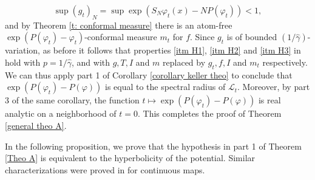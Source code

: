 \documentclass[12pt]{amsart}
\numberwithin{equation}{section} %
\numberwithin{figure}{section} %
\theoremstyle{plain}
\theoremstyle{definition}
\theoremstyle{remark}
\theoremstyle{citing}
\renewcommand{\=}{\coloneqq}
\begin{document}
\begin{equation*}\sup (g_t)_N = \sup \exp(S_N \varphi_t(x) - NP(\varphi_t))<1,
\end{equation*}
and by Theorem \ref{t: conformal measure} there is an atom-free $\exp(P(\varphi_t)-\varphi_t)$-conformal measure $m_t$ for $f$. Since $g_t$ is of bounded $(1/\widehat{\gamma})$-variation, as before it follows that properties \ref{itm H1}, \ref{itm H2} and \ref{itm H3} in  hold with $p=1/\widehat{\gamma}$, and with $g,T,I$ and $m$ replaced by $g_t,f,I$ and $m_t$ respectively. We can thus apply part 1 of Corollary \ref{corollary keller theo} to conclude that $\exp(P(\varphi_t)-P(\varphi))$ is equal to the spectral radius of $\mathscr{L}_t$. Moreover, by part 3 of the same corollary, the function $t\mapsto \exp(P(\varphi_t)-P(\varphi))$ is real analytic on a neighborhood of $t=0$. This completes the proof of Theorem \ref{general theo A}.
\endproof

In the following proposition, we prove that the hypothesis in part 1 of Theorem \ref{Theo A} is equivalent to the hyperbolicity of the potential. Similar characterizations were proved in \cite{InoquioRivera} for continuous maps.
\end{document}
